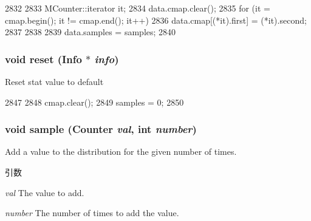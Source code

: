 \begin{DoxyCode}
2832     {
2833         MCounter::iterator it;
2834         data.cmap.clear();
2835         for (it = cmap.begin(); it != cmap.end(); it++) {
2836             data.cmap[(*it).first] = (*it).second;
2837         }
2838 
2839         data.samples = samples;
2840     }
\end{DoxyCode}
\hypertarget{classStats_1_1SparseHistStor_a10d9d71be6e0d2194999bb5dd5280e2d}{
\subsubsection[{reset}]{\setlength{\rightskip}{0pt plus 5cm}void reset ({\bf Info} $\ast$ {\em info})}}
\label{classStats_1_1SparseHistStor_a10d9d71be6e0d2194999bb5dd5280e2d}
Reset stat value to default 


\begin{DoxyCode}
2847     {
2848         cmap.clear();
2849         samples = 0;
2850     }
\end{DoxyCode}
\hypertarget{classStats_1_1SparseHistStor_a57fea70de4ed8fee9ec9e9d9cca6f9fa}{
\subsubsection[{sample}]{\setlength{\rightskip}{0pt plus 5cm}void sample ({\bf Counter} {\em val}, \/  int {\em number})}}
\label{classStats_1_1SparseHistStor_a57fea70de4ed8fee9ec9e9d9cca6f9fa}
Add a value to the distribution for the given number of times. 
\begin{DoxyParams}{引数}
\item[{\em val}]The value to add. \item[{\em number}]The number of times to add the value. \end{DoxyParams}



